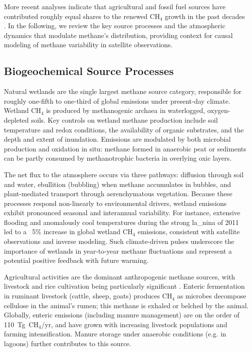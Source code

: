 More recent analyses indicate that agricultural and fossil fuel sources have contributed roughly equal shares to the renewed CH$_4$ growth in the past decades \cite{Jackson_2020}. In the following, we review the key source processes and the atmospheric dynamics that modulate methane's distribution, providing context for causal modeling of methane variability in satellite observations.

\subsection{Biogeochemical Source Processes}

Natural wetlands are the single largest methane source category, responsible for roughly one-fifth to one-third of global emissions under present-day climate. Wetland CH$_4$ is produced by methanogenic archaea in waterlogged, oxygen-depleted soils. Key controls on wetland methane production include soil temperature and redox conditions, the availability of organic substrates, and the depth and extent of inundation. Emissions are modulated by both microbial production and oxidation in situ: methane formed in anaerobic peat or sediments can be partly consumed by methanotrophic bacteria in overlying oxic layers.

The net flux to the atmosphere occurs via three pathways: diffusion through soil and water, \gls{ebullition} (bubbling) when methane accumulates in bubbles, and plant-mediated transport through aerenchymatous vegetation. Because these processes respond non-linearly to environmental drivers, wetland emissions exhibit pronounced seasonal and interannual variability. For instance, extensive flooding and anomalously cool temperatures during the strong \gls{la_nina} of 2011 led to a ~5\% increase in global wetland CH$_4$ emissions, consistent with satellite observations and inverse modeling. Such climate-driven pulses underscore the importance of wetlands in year-to-year methane fluctuations and represent a potential positive feedback with future warming.

Agricultural activities are the dominant anthropogenic methane sources, with livestock and rice cultivation being particularly significant \cite{Jackson_2020}. Enteric fermentation in ruminant livestock (cattle, sheep, goats) produces CH$_4$ as microbes decompose cellulose in the animal's rumen; this methane is exhaled or belched by the animal. Globally, enteric emissions (including manure management) are on the order of 110~Tg~CH$_4$/yr, and have grown with increasing livestock populations and farming intensification. Manure storage under anaerobic conditions (e.g. in lagoons) further contributes to this source.

